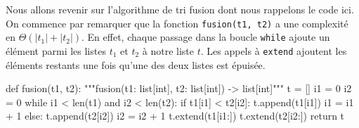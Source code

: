 \documentclass{magnolia}
\begin{document}

Nous allons revenir sur l'algorithme de tri fusion dont nous rappelons le code ici. On
commence par remarquer que la fonction \verb!fusion(t1, t2)! a une complexité en
$\Theta(|t_1|+|t_2|)$. En effet, chaque passage dans la boucle \verb!while! ajoute un
élément parmi les listes $t_1$ et $t_2$ à notre liste $t$. Les appels à \verb!extend!
ajoutent les éléments restants une fois qu'une des deux listes est épuisée.
\begin{pythoncodeline}
def fusion(t1, t2):
    """fusion(t1: list[int], t2: list[int]) -> list[int]"""
    t = []
    i1 = 0
    i2 = 0
    while i1 < len(t1) and i2 < len(t2):
        if t1[i1] < t2[i2]:
            t.append(t1[i1])
            i1 = i1 + 1
        else:
            t.append(t2[i2])
            i2 = i2 + 1
    t.extend(t1[i1:])
    t.extend(t2[i2:])
    return t
\end{pythoncodeline}
\end{document}
